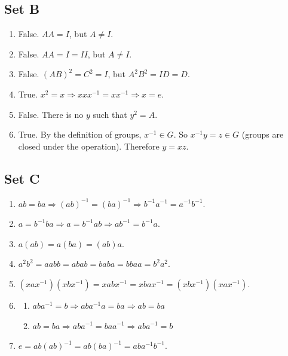 \documentclass{article}
\begin{document}
\subsection{Set B}
\begin{enumerate}
    \item False. $AA = I$, but $A \ne I$.
    \item False. $AA = I = II$, but $A \ne I$.
    \item False. $(AB)^2 = C^2 = I$, but $A^2B^2 = ID = D$.
    \item True. $x^2 = x \Rightarrow xxx^{-1} = xx^{-1} \Rightarrow x = e$.
    \item False. There is no $y$ such that $y^2 = A$.
    \item True. By the definition of groups, $x^{-1} \in G$. So $x^{-1}y = z \in G$ (groups are closed under the operation). Therefore $y = xz$. 
\end{enumerate}

\subsection{Set C}
\begin{enumerate}
    \item $ab = ba \Rightarrow (ab)^{-1} = (ba)^{-1} \Rightarrow b^{-1}a^{-1} = a^{-1}b^{-1}$.
    \item $a = b^{-1}ba \Rightarrow a = b^{-1}ab \Rightarrow ab^{-1} = b^{-1}a$.
    \item $a(ab) = a(ba) = (ab)a$.
    \item $a^2b^2 = aabb = abab = baba = bbaa = b^2a^2$.
    \item $(xax^{-1})(xbx^{-1}) = xabx^{-1} = xbax^{-1} = (xbx^{-1})(xax^{-1})$.
    \item 
        \begin{enumerate}
            \item $ aba^{-1} = b \Rightarrow aba^{-1}a = ba \Rightarrow ab = ba $

            \item $ ab = ba \Rightarrow aba^{-1} = baa^{-1} \Rightarrow aba^{-1} = b $
        \end{enumerate}
    \item $e = ab(ab)^{-1} = ab(ba)^{-1} = aba^{-1}b^{-1}$.
\end{enumerate}
\end{document}
